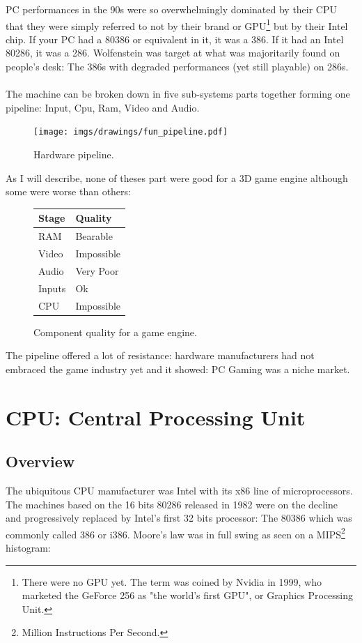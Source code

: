 \documentclass[book.tex]{subfiles}
\begin{document}
PC performances in the 90s were so overwhelmingly dominated by their CPU that they were simply referred to not by their brand or GPU\footnote{There were no GPU yet. The term was coined by Nvidia in 1999, who marketed the GeForce 256 as "the world's first GPU", or Graphics Processing Unit.} but by their Intel chip. If your PC had a 80386 or equivalent in it, it was a 386. If it had an Intel 80286, it was a 286. Wolfenstein was target at what was majoritarily found on people's desk: The 386s with degraded performances (yet still playable) on 286s.\\
\\
The machine can be broken down in five sub-systems parts together forming one pipeline: Input, Cpu, Ram, Video and Audio.\\
 \bigskip
\begin{figure}[H]
\centering
\texttt{[image: imgs/drawings/fun\_pipeline.pdf]}
%
\caption{Hardware pipeline.}
\label{fig:digraph}
\end{figure}

As I will describe, none of theses part were good for a 3D game engine although some were worse than others:

 \bigskip

\begin{figure}[H]
\centering
\begin{tabularx}{\textwidth}{ X X  }
  \toprule
  \textbf{Stage} & \textbf{Quality} \\ \bottomrule
  RAM & Bearable \\ 
  Video & Impossible \\ 
  Audio & Very Poor \\ 
  Inputs & Ok \\ 
  CPU & Impossible \\ \bottomrule
\end{tabularx}
\caption{Component quality for a game engine.}
\end{figure}

The pipeline offered a lot of resistance: hardware manufacturers had not embraced the game industry yet and it showed: PC Gaming was a niche market.\\

\section{CPU: Central Processing Unit}
  \subsection{Overview}
  The ubiquitous CPU manufacturer was Intel with its x86 line of microprocessors. The machines based on the 16 bits 80286 released in 1982 were on the decline and progressively replaced by Intel's first 32 bits processor: The 80386 which was commonly called 386 or i386. Moore's law was in full swing as seen on a MIPS\footnote{Million Instructions Per Second.} histogram:
\end{document}
